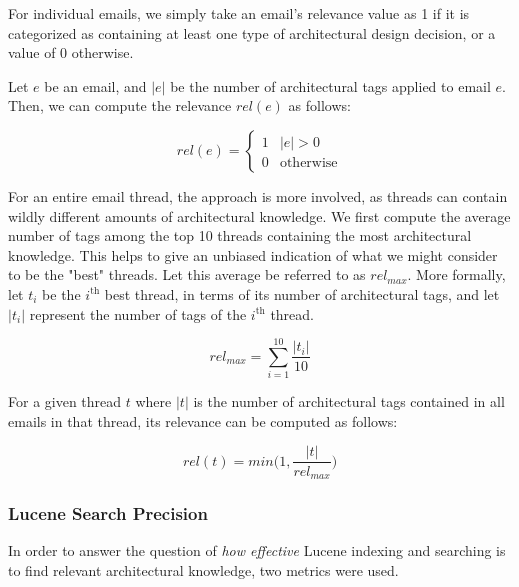 \documentclass[a4paper, 12pt]{article}
\begin{document}
			For individual emails, we simply take an email's relevance value as 1 if it is categorized as containing at least one type of architectural design decision, or a value of 0 otherwise.
			
			Let $ e $ be an email, and $ |e| $ be the number of architectural tags applied to email $ e $. Then, we can compute the relevance $ rel(e) $ as follows:
			
			\begin{equation}
				\tag{Email Relevance}
				rel(e) =
				\begin{cases}
					1 & |e| > 0 \\
					0 & \text{otherwise}
				\end{cases}
				\label{eqn:relemail}
			\end{equation}
		
			For an entire email thread, the approach is more involved, as threads can contain wildly different amounts of architectural knowledge. We first compute the average number of tags among the top 10 threads containing the most architectural knowledge. This helps to give an unbiased indication of what we might consider to be the "best" threads. Let this average be referred to as $ rel_{max} $. More formally, let $ t_i $ be the $ i^{\text{th}} $ best thread, in terms of its number of architectural tags, and let $ |t_i| $ represent the number of tags of the $ i^{\text{th}} $ thread.
			
			\begin{equation}
				\tag{Email Thread Max Relevance}
				rel_{max} = \sum_{i=1}^{10} \frac{|t_i|}{10}
				\label{eqn:relmax}
			\end{equation}
			
			For a given thread $ t $ where $ |t| $ is the number of architectural tags contained in all emails in that thread, its relevance can be computed as follows:
			
			\begin{equation}
				\tag{Email Thread Relevance}
				rel(t) = min\Big(1, \frac{|t|}{rel_{max}}\Big)
				\label{eqn:relthread}
			\end{equation}
		
		\subsubsection{Lucene Search Precision}
			In order to answer the question of \textit{how effective} Lucene indexing and searching is to find relevant architectural knowledge, two metrics were used.
			
\end{document}
